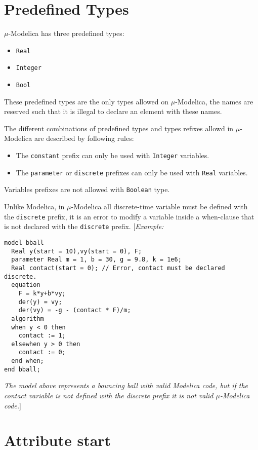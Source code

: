 \documentclass[11pt,a4paper,notitlepage]{report}
\begin{document}
\section{Predefined Types}\label{types:predefined}

$\mu$-Modelica has three predefined types:

\begin{itemize}
\item \verb"Real"
\item \verb"Integer"
\item \verb"Bool"
\end{itemize}

These predefined types are the only types allowed on $\mu$-Modelica, the names are reserved such that it is illegal to declare an element with these names.
 
The different combinations of predefined types and types refixes allowd in $\mu$-Modelica are described by following rules:
\begin{itemize}
\item The \verb"constant" prefix can only be used with \verb"Integer" variables. 
\item The \verb"parameter" or \verb"discrete" prefixes can only be used with \verb"Real" variables.   
\end{itemize} 
Variables prefixes are not allowed with \verb"Boolean" type. 

Unlike Modelica, in $\mu$-Modelica all discrete-time variable must be defined with the \verb"discrete" prefix, it is an error to modify a variable inside a when-clause that is not declared with the \verb"discrete" prefix.
[\emph{Example:}
\begin{verbatim}
model bball
  Real y(start = 10),vy(start = 0), F;
  parameter Real m = 1, b = 30, g = 9.8, k = 1e6;
  Real contact(start = 0); // Error, contact must be declared discrete.
  equation
    F = k*y+b*vy;
    der(y) = vy;
    der(vy) = -g - (contact * F)/m;
  algorithm 
  when y < 0 then
    contact := 1;
  elsewhen y > 0 then
    contact := 0;
  end when;
end bball;
\end{verbatim}
\emph{The model above represents a bouncing ball with valid Modelica code, but if the contact variable is not defined with the discrete prefix it is not valid $\mu$-Modelica code.}]    

\section{Attribute start}
\end{document}
